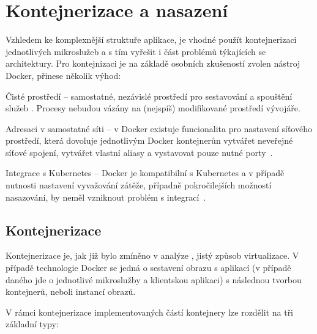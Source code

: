 \chapter{Kontejnerizace a nasazení}\label{ch:deployment}


Vzhledem ke komplexnější struktuře aplikace, je vhodné použít kontejnerizaci jednotlivých mikroslužeb a s tím vyřešit i část problémů týkajících se architektury.
Pro kontejnizaci je na základě osobních zkušeností zvolen nástroj Docker, přinese několik výhod:

\begin{dl}
   \item[Čisté prostředí] – samostatné, nezávislé prostředí pro sestavování a spouštění služeb .
   Procesy nebudou vázány na (nejspíš) modifikované prostředí vývojáře.
   \item[Adresaci v samostatné síti] – v Docker existuje funcionalita pro nastavení síťového prostředí, která dovoluje jednotlivým Docker kontejnerůn vytvářet neveřejné síťové spojení, vytvářet vlastní aliasy a vystavovat pouze nutné porty~\cite{dockernetwork}.
   \item[Integrace s Kubernetes] – Docker je kompatibilní s Kubernetes a v případě nutnosti nastavení vyvažování zátěže, případně pokročilejších možností nasazování, by neměl vzniknout problém s integrací~\cite{dockerkubernetes}.
\end{dl}


\newpage



\section{Kontejnerizace}\label{sec:contenerization}

Kontejnerizace je, jak již bylo zmíněno v analýze , jistý způsob virtualizace.
V případě technologie Docker se jedná o sestavení obrazu s aplikací (v případě daného  jde o jednotlivé mikroslužby a klientskou aplikaci) s následnou tvorbou kontejnerů, neboli instancí obrazů.

V rámci kontejnerizace implementovaných částí kontejnery lze rozdělit na tři základní typy:

